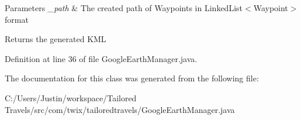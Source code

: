\begin{DoxyParams}{Parameters}
{\em \-\_\-path} & The created path of Waypoints in Linked\-List$<$\-Waypoint$>$ format \\
\hline
\end{DoxyParams}
\begin{DoxyReturn}{Returns}
the generated K\-M\-L 
\end{DoxyReturn}


Definition at line 36 of file Google\-Earth\-Manager.\-java.



The documentation for this class was generated from the following file\-:\begin{DoxyCompactItemize}
\item 
C\-:/\-Users/\-Justin/workspace/\-Tailored Travels/src/com/twix/tailoredtravels/Google\-Earth\-Manager.\-java\end{DoxyCompactItemize}
